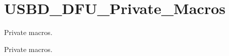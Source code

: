 \hypertarget{group__USBD__DFU__Private__Macros}{}\section{U\+S\+B\+D\+\_\+\+D\+F\+U\+\_\+\+Private\+\_\+\+Macros}
\label{group__USBD__DFU__Private__Macros}


Private macros.  


Private macros. 

